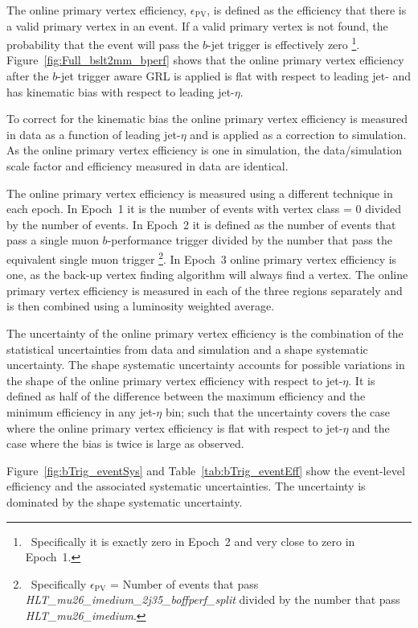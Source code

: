 The online primary vertex efficiency, $\epsilon_{\text{PV}}$,
is defined as the efficiency that there is a valid primary vertex in an event.
If a valid primary vertex is not found, the probability that the event will pass the $b$-jet trigger is effectively zero
\footnote{\ Specifically it is exactly zero in Epoch~2 and very close to zero in Epoch~1.}.
Figure~\ref{fig:Full_bslt2mm_bperf} shows that the online primary vertex efficiency
after the $b$-jet trigger aware GRL is applied is flat with respect to leading jet-\pT{}
and has kinematic bias with respect to leading jet-$\eta$.

To correct for the kinematic bias the online primary vertex efficiency is measured in data as a function of leading jet-$\eta$ and is applied as a correction to simulation.
As the online primary vertex efficiency is one in simulation, the data/simulation scale factor and efficiency measured in data are identical.

The online primary vertex efficiency is measured using a different technique in each epoch.
In Epoch~1 it is the number of events with vertex class = 0 divided by the number of events.
In Epoch~2 it is defined as the number of events that pass a single muon $b$-performance trigger divided
by the number that pass the equivalent single muon trigger \footnote{\ Specifically $\epsilon_{\text{PV}}$ = Number of events that pass \textit{HLT\_mu26\_imedium\_2j35\_boffperf\_split}
  divided by the number that pass \textit{HLT\_mu26\_imedium}.}.
In Epoch~3 online primary vertex efficiency is one, as the back-up vertex finding algorithm will always find a vertex.
The online primary vertex efficiency is measured in each of the three regions separately and is then combined using a luminosity weighted average.

The uncertainty of the online primary vertex efficiency is the combination of the statistical uncertainties from data and simulation
and a shape systematic uncertainty.
The shape systematic uncertainty accounts for possible variations in the shape of the online primary vertex efficiency with respect to jet-$\eta$.
It is defined as half of the difference between the maximum efficiency and the minimum efficiency in any jet-$\eta$ bin;
such that the uncertainty covers the case where the online primary vertex efficiency is flat with respect to jet-$\eta$ and
the case where the bias is twice is large as observed.

Figure~\ref{fig:bTrig_eventSys} and Table~\ref{tab:bTrig_eventEff}
show the event-level efficiency and the associated systematic uncertainties.
The uncertainty is dominated by the shape systematic uncertainty.

